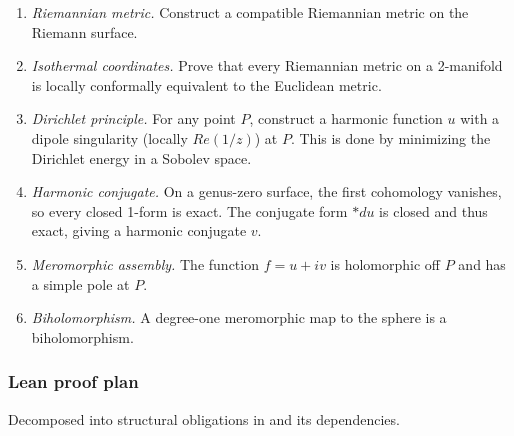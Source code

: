 \begin{enumerate}
\item \emph{Riemannian metric.} Construct a compatible Riemannian metric on the Riemann surface.
\item \emph{Isothermal coordinates.} Prove that every Riemannian metric on a 2-manifold is locally conformally equivalent to the Euclidean metric.
\item \emph{Dirichlet principle.} For any point \(P\), construct a harmonic function \(u\) with a dipole singularity (locally \(Re(1/z)\)) at \(P\). This is done by minimizing the Dirichlet energy in a Sobolev space.
\item \emph{Harmonic conjugate.} On a genus-zero surface, the first cohomology vanishes, so every closed 1-form is exact. The conjugate form \(*du\) is closed and thus exact, giving a harmonic conjugate \(v\).
\item \emph{Meromorphic assembly.} The function \(f = u + iv\) is holomorphic off \(P\) and has a simple pole at \(P\).
\item \emph{Biholomorphism.} A degree-one meromorphic map to the sphere is a biholomorphism.
\end{enumerate}

\subsubsection*{Lean proof plan}

Decomposed into structural obligations in  and its dependencies.


